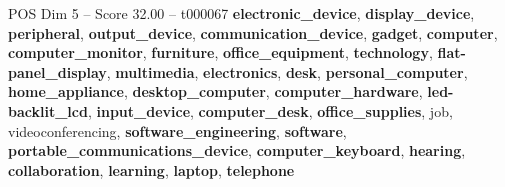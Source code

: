 \begin{textsample}{POS Dim 5 – Score 32.00 – t000067}  \label{ex:f5_pos_013}
\textbf{electronic\_device}, \textbf{display\_device}, \textbf{peripheral}, \textbf{output\_device}, \textbf{communication\_device}, \textbf{gadget}, \textbf{computer}, \textbf{computer\_monitor}, \textbf{furniture}, \textbf{office\_equipment}, \textbf{technology}, \textbf{flat-panel\_display}, \textbf{multimedia}, \textbf{electronics}, \textbf{desk}, \textbf{personal\_computer}, \textbf{home\_appliance}, \textbf{desktop\_computer}, \textbf{computer\_hardware}, \textbf{led-backlit\_lcd}, \textbf{input\_device}, \textbf{computer\_desk}, \textbf{office\_supplies}, job, videoconferencing, \textbf{software\_engineering}, \textbf{software}, \textbf{portable\_communications\_device}, \textbf{computer\_keyboard}, \textbf{hearing}, \textbf{collaboration}, \textbf{learning}, \textbf{laptop}, \textbf{telephone}

\end{textsample}
